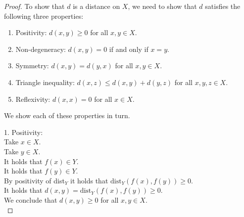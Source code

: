 \documentclass{article}
\theoremstyle{mytheoremstyle}
\theoremstyle{mytheoremstyle}
\theoremstyle{myproblemstyle}
\begin{document}
    \begin{proof}
        To show that $d$ is a distance on $X$, we need to show that $d$ satisfies the following three properties:
        \begin{enumerate}
            \item Positivity: $d(x,y) \geq 0$ for all $x,y \in X$.
            \item Non-degeneracy: $d(x,y) = 0$ if and only if $x = y$.
            \item Symmetry: $d(x,y) = d(y,x)$ for all $x,y \in X$.
            \item Triangle inequality: $d(x,z) \leq d(x,y) + d(y,z)$ for all $x,y,z \in X$.
            \item Reflexivity: $d(x,x) = 0$ for all $x \in X$.
        \end{enumerate}

        We show each of these properties in turn.

        1. Positivity: \\
        Take $x \in X$. \\
        Take $y \in X$. \\
        It holds that $f(x) \in Y$. \\
        It holds that $f(y) \in Y$. \\
        By positivity of dist$_Y$ it holds that $\text{dist}_Y(f(x),f(y)) \geq 0$. \\
        It holds that $d(x,y) = \text{dist}_Y(f(x),f(y)) \geq 0$. \\
        We conclude that $d(x,y) \geq 0$ for all $x,y \in X$. \\


\end{proof}
\end{document}
